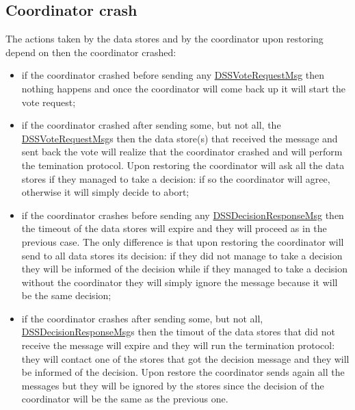 \subsection{Coordinator crash}
The actions taken by the data stores and by the coordinator upon restoring depend on then the coordinator crashed:
\begin{itemize}
    \item if the coordinator crashed before sending any \url{DSSVoteRequestMsg} then nothing happens and once the coordinator will come back up it will start the vote request;
    \item if the coordinator crashed after sending some, but not all, the \url{DSSVoteRequestMsg}s then the data store(s) that received the message and sent back the vote will realize that the coordinator crashed and will perform the temination protocol. Upon restoring the coordinator will ask all the data stores if they managed to take a decision: if so the coordinator will agree, otherwise it will simply decide to abort;
    \item if the coordinator crashes before sending any \url{DSSDecisionResponseMsg} then the timeout of the data stores will expire and they will proceed as in the previous case. The only difference is that upon restoring the coordinator will send to all data stores its decision: if they did not manage to take a decision they will be informed of the decision while if they managed to take a decision without the coordinator they will simply ignore the message because it will be the same decision;
    \item if the coordinator crashes after sending some, but not all, \url{DSSDecisionResponseMsg}s then the timout of the data stores that did not receive the message will expire and they will run the termination protocol: they will contact one of the stores that got the decision message and they will be informed of the decision. Upon restore the coordinator sends again all the messages but they will be ignored by the stores since the decision of the coordinator will be the same as the previous one.
\end{itemize}

